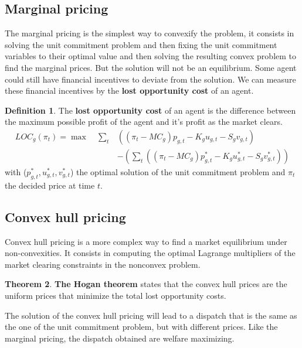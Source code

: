 \documentclass[12pt, openany]{report}
\theoremstyle{definition}
\newtheorem{thm}{Theorem}[chapter]
\newtheorem{definition}[thm]{Definition}
\begin{document}
\subsection{Marginal pricing}
The marginal pricing is the simplest way to convexify the problem, it consists in solving the unit commitment problem and then fixing the unit commitment variables to their optimal value and then solving the resulting convex problem to find the marginal prices. But the solution will not be an equilibrium. Some agent could still have financial incentives to deviate from the solution. We can measure these financial incentives by the \textbf{lost opportunity cost} of an agent.
\begin{definition}
    The \textbf{lost opportunity cost} of an agent is the difference between the maximum possible profit of the agent and it's profit as the market clears.
    \begin{equation}
        \begin{aligned}
        LOC_g(\pi_t) = \max \quad \sum_{t} &\left((\pi_t - MC_g) p_{g,t} - K_g u_{g,t} - S_g v_{g,t}\right)\\ 
        &- \left(\sum_{t} \left((\pi_t - MC_g) p_{g,t}^* - K_g u_{g,t}^* - S_g v_{g,t}^*\right)\right)
        \end{aligned}
    \end{equation}
    with ($p_{g,t}^*, u_{g,t}^*, v_{g,t}^*$) the optimal solution of the unit commitment problem and $\pi_t$ the decided price at time $t$.
\end{definition}
\subsection{Convex hull pricing}
Convex hull pricing is a more complex way to find a market equilibrium under non-convexities. It consists in computing the optimal Lagrange multipliers of the market clearing constraints in the nonconvex problem. 
\begin{thm}
    \textbf{The Hogan theorem} states that the convex hull prices are the uniform prices that minimize the total lost opportunity costs.
\end{thm}
The solution of the convex hull pricing will lead to a dispatch that is the same as the one of the unit commitment problem, but with different prices. Like the marginal pricing, the dispatch obtained are welfare maximizing.
\end{document}
